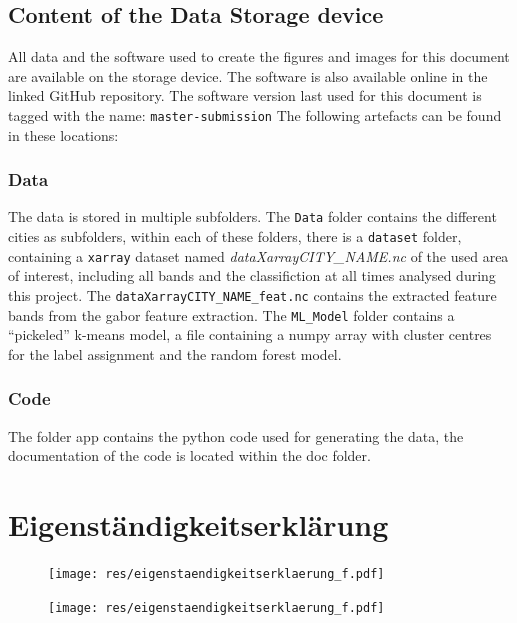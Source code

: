 \documentclass[12pt,a4paper, english,twoside]{scrartcl}
\begin{document}
  \subsection{Content of the Data Storage device}
    All data and the software used to create the figures and images for this document are available on the storage device.
    The software is also available online in the linked GitHub repository.
    The software version last used for this document is tagged with the name: \texttt{master-submission}
    The following artefacts can be found in these locations:
  \subsubsection{Data}
    The data is stored in multiple subfolders. 
    The \texttt{Data} folder contains the different cities as subfolders, within each of these folders, there is a \texttt{dataset} folder, containing a \texttt{xarray} dataset named \textit{dataXarrayCITY\_NAME.nc} of the used area of interest, including all bands and the classifiction at all times analysed during this project. 
    The \texttt{dataXarrayCITY\_NAME\_feat.nc} contains the extracted feature bands from the gabor feature extraction.
    The \texttt{ML\_Model} folder contains a ``pickeled'' k-means model, a file containing a numpy array with cluster centres for the label assignment and the random forest model. 
  \subsubsection{Code}\label{sec:code}
      The folder app contains the python code used for generating the data, the documentation of the code is located within the doc folder.
\newpage
\printbibliography%
\newpage
{}
\section*{Eigenständigkeitserklärung}\label{sec:eigenstaendigkeit}
\begin{figure}[!b]
    \texttt{[image: res/eigenstaendigkeitserklaerung\_f.pdf]}
\end{figure}
\newpage
\begin{figure}[!b]
    \texttt{[image: res/eigenstaendigkeitserklaerung\_f.pdf]}
\end{figure}
%
\restoregeometry%
\end{document}

